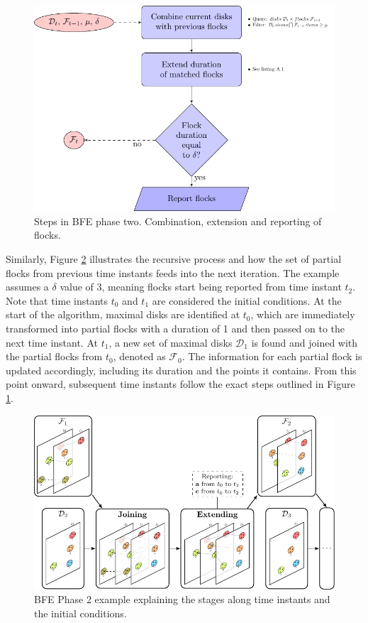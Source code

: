 \begin{figure}
    \centering
    \includegraphics[width=0.85\linewidth]{chapterPFlocks/figures/FF_flowchart}
    \caption{Steps in BFE phase two. Combination, extension and reporting of flocks.}\label{fig:FF_flowchart}
\end{figure}

Similarly, Figure \ref{fig:FF_stages} illustrates the recursive process and how the set of partial flocks from previous time instants feeds into the next 
iteration. The example assumes a $\delta$ value of 3, meaning flocks start being reported from time instant $t_2$. Note that time instants $t_0$ and $t_1$ are 
considered the initial conditions. At the start of the algorithm, maximal disks are identified at $t_0$, which are immediately transformed into partial flocks 
with a duration of 1 and then passed on to the next time instant. At $t_1$, a new set of maximal disks $\mathcal{D}_1$ is found and joined with the partial 
flocks from $t_0$, denoted as $\mathcal{F}_0$. The information for each partial flock is updated accordingly, including its duration and the points it contains. 
From this point onward, subsequent time instants follow the exact steps outlined in Figure \ref{fig:FF_flowchart}.

\begin{figure}
    \centering
    \includegraphics[width=\linewidth]{chapterPFlocks/figures/Temporal/f_stages}
    \caption{BFE Phase 2 example explaining the stages along time instants and the initial conditions.}\label{fig:FF_stages}
\end{figure}

